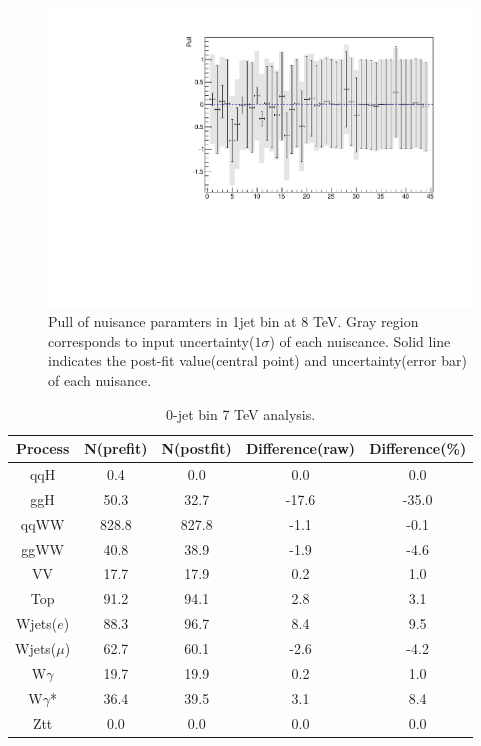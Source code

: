 \begin{figure}[!hbtp]
\centering 
\includegraphics[width=.75\textwidth]{figures/postnuisance_1j_8tev.pdf}
\caption{Pull of nuisance paramters in 1jet bin at 8 TeV.
Gray region corresponds to input uncertainty($1\sigma$) of each nuiscance.
Solid line indicates the post-fit value(central point) and uncertainty(error bar)
of each nuisance.}
\label{fig:nuisance_1j_8tev}
\end{figure} 
\clearpage 

\begin{table}[ht!]
\begin{center}
\begin{tabular}{c|cc|cc}
\hline \hline
Process     &    N(prefit) &   N(postfit) & Difference(raw) &  Difference(\%)  \\  
\hline \hline
qqH         &        0.4 &        0.0 &        0.0 &        0.0        \\
ggH         &       50.3 &       32.7 &      -17.6 &      -35.0        \\
\hline
qqWW        &      828.8 &      827.8 &       -1.1 &       -0.1        \\
ggWW        &       40.8 &       38.9 &       -1.9 &       -4.6        \\
\hline
VV          &       17.7 &       17.9 &        0.2 &        1.0        \\
\hline
Top         &       91.2 &       94.1 &        2.8 &        3.1        \\
\hline
Wjets($e$)  &       88.3 &       96.7 &        8.4 &        9.5        \\
Wjets($\mu$) &       62.7 &       60.1 &       -2.6 &       -4.2        \\
\hline
W$\gamma$   &       19.7 &       19.9 &        0.2 &        1.0        \\
W$\gamma$*  &       36.4 &       39.5 &        3.1 &        8.4        \\
\hline
Ztt         &        0.0 &        0.0 &        0.0 &        0.0        \\
\hline \hline
\end{tabular}
\caption{0-jet bin 7 TeV analysis.}
\label{tab:postnorm_0j_7tev}
\end{center}
\end{table} 

